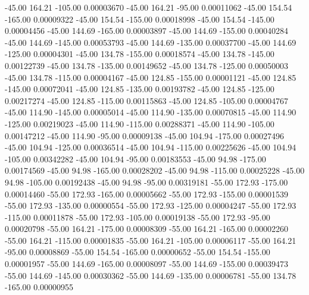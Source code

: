     -45.00    164.21   -105.00     0.00003670
    -45.00    164.21    -95.00     0.00011062
    -45.00    154.54   -165.00     0.00009322
    -45.00    154.54   -155.00     0.00018998
    -45.00    154.54   -145.00     0.00004456
    -45.00    144.69   -165.00     0.00003897
    -45.00    144.69   -155.00     0.00040284
    -45.00    144.69   -145.00     0.00053793
    -45.00    144.69   -135.00     0.00037700
    -45.00    144.69   -125.00     0.00004301
    -45.00    134.78   -155.00     0.00018574
    -45.00    134.78   -145.00     0.00122739
    -45.00    134.78   -135.00     0.00149652
    -45.00    134.78   -125.00     0.00050003
    -45.00    134.78   -115.00     0.00004167
    -45.00    124.85   -155.00     0.00001121
    -45.00    124.85   -145.00     0.00072041
    -45.00    124.85   -135.00     0.00193782
    -45.00    124.85   -125.00     0.00217274
    -45.00    124.85   -115.00     0.00115863
    -45.00    124.85   -105.00     0.00004767
    -45.00    114.90   -145.00     0.00005014
    -45.00    114.90   -135.00     0.00070815
    -45.00    114.90   -125.00     0.00219023
    -45.00    114.90   -115.00     0.00288371
    -45.00    114.90   -105.00     0.00147212
    -45.00    114.90    -95.00     0.00009138
    -45.00    104.94   -175.00     0.00027496
    -45.00    104.94   -125.00     0.00036514
    -45.00    104.94   -115.00     0.00225626
    -45.00    104.94   -105.00     0.00342282
    -45.00    104.94    -95.00     0.00183553
    -45.00     94.98   -175.00     0.00174569
    -45.00     94.98   -165.00     0.00028202
    -45.00     94.98   -115.00     0.00025228
    -45.00     94.98   -105.00     0.00192438
    -45.00     94.98    -95.00     0.00319181
    -55.00    172.93   -175.00     0.00014460
    -55.00    172.93   -165.00     0.00005662
    -55.00    172.93   -155.00     0.00001539
    -55.00    172.93   -135.00     0.00000554
    -55.00    172.93   -125.00     0.00004247
    -55.00    172.93   -115.00     0.00011878
    -55.00    172.93   -105.00     0.00019138
    -55.00    172.93    -95.00     0.00020798
    -55.00    164.21   -175.00     0.00008309
    -55.00    164.21   -165.00     0.00002260
    -55.00    164.21   -115.00     0.00001835
    -55.00    164.21   -105.00     0.00006117
    -55.00    164.21    -95.00     0.00008869
    -55.00    154.54   -165.00     0.00000652
    -55.00    154.54   -155.00     0.00001957
    -55.00    144.69   -165.00     0.00008097
    -55.00    144.69   -155.00     0.00039473
    -55.00    144.69   -145.00     0.00030362
    -55.00    144.69   -135.00     0.00006781
    -55.00    134.78   -165.00     0.00000955
